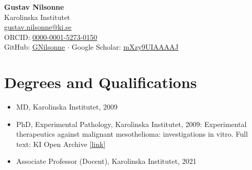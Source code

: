 \documentclass[10pt,a4paper,twocolumn]{article}
\begin{document}
\begin{center}
    {\LARGE\bfseries Gustav Nilsonne}\\[0.5em]
    Karolinska Institutet\\
    \href{mailto:gustav.nilsonne@ki.se}{gustav.nilsonne@ki.se}\\
    ORCID: \href{https://orcid.org/0000-0001-5273-0150}{0000-0001-5273-0150}
    \\
    GitHub: \href{https://github.com/GNilsonne}{GNilsonne}
     $\cdot$ Google Scholar: \href{https://scholar.google.com/citations?user=mXzy9UIAAAAJ}{mXzy9UIAAAAJ}
    
\end{center}

\vspace{0.5em}


\section{Degrees and Qualifications}
\begin{itemize}

    \item MD, Karolinska Institutet, 2009

    \item PhD, Experimental Pathology, Karolinska Institutet, 2009: Experimental therapeutics against malignant mesothelioma: investigations in vitro. Full text: KI Open Archive \href{https://openarchive.ki.se/xmlui/handle/10616/38731}{[link]}

    \item Associate Professor (Docent), Karolinska Institutet, 2021

\end{itemize}


\end{document}

